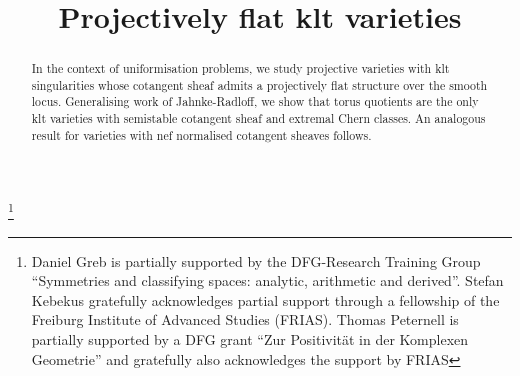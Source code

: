 \documentclass[JEP,XML,SOM,Unicode,published]{cedram}
\theoremstyle{plain}
\theoremstyle{definition}
\numberwithin{equation}{thm}
\numberwithin{enumi}{thm}
\begin{document}
\frontmatter
\title{Projectively flat klt varieties}

\author[\initial{D.} \lastname{Greb}]{ }
\address{Essener Seminar für Algebraische Geometrie und Arithmetik, Fakultät für Mathematik, Universität Duisburg--Essen\\
45117 Essen, Germany}

\author[\initial{S.} \lastname{Kebekus}]{ }
\address{Mathematisches Institut, Albert-Ludwigs-Universität Freiburg\\ Ernst-Zermelo-Straße 1, 79104 Freiburg im Breisgau, Germany}
\address{\& Freiburg Institute for Advanced Studies (FRIAS)\\
Freiburg im Breisgau, Germany}

\author[\initial{T.} \lastname{Peternell}]{ }
\address{Mathematisches Institut, Universität Bayreuth\\
95440~Bayreuth, Germany}

\thanks{Daniel Greb is partially supported by the DFG-Research Training Group
``Symmetries and classifying spaces: analytic, arithmetic and derived''.
Stefan Kebekus gratefully acknowledges partial support through a fellowship of
the Freiburg Institute of Advanced Studies (FRIAS). Thomas Peternell is
partially supported by a DFG grant ``Zur Positivität in der Komplexen
Geometrie'' and gratefully also acknowledges the support by FRIAS}

\begin{abstract}
In the context of uniformisation problems, we study projective varieties with klt singularities whose cotangent sheaf admits a projectively flat structure over the smooth locus. Generalising work of Jahnke-Radloff, we show that torus quotients are the only klt varieties with semistable cotangent sheaf and extremal Chern classes. An analogous result for varieties with nef normalised cotangent sheaves follows.
\end{abstract}


\end{document}
